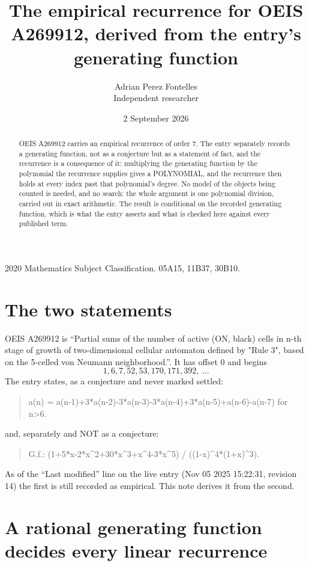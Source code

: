 \documentclass[11pt,a4paper]{article}
\title{The empirical recurrence for OEIS A269912, derived from the entry's generating function}
\author{Adrian Perez Fontelles\\ \small Independent researcher}
\date{2 September 2026}
\theoremstyle{plain}
\theoremstyle{definition}
\begin{document}
\maketitle

\begin{abstract}
OEIS A269912 carries an empirical recurrence of order $7$. The entry separately records a
generating function, not as a conjecture but as a statement of fact, and the recurrence is a
consequence of it: multiplying the generating function by the polynomial the recurrence
supplies gives a POLYNOMIAL, and the recurrence then holds at every index past that
polynomial's degree. No model of the objects being counted is needed, and no search: the
whole argument is one polynomial division, carried out in exact arithmetic. The result is
conditional on the recorded generating function, which is what the entry asserts and what is
checked here against every published term.
\end{abstract}

\noindent\small 2020 Mathematics Subject Classification. 05A15, 11B37, 30B10.\normalsize

\section{The two statements}

OEIS A269912 is ``Partial sums of the number of active (ON, black) cells in n-th stage of growth of two-dimensional cellular automaton defined by "Rule 3", based on the 5-celled von Neumann neighborhood.''. It has offset $0$ and begins
\[
1, 6, 7, 52, 53, 170, 171, 392,\ \dots
\]
The entry states, as a conjecture and never marked settled:
\begin{quote}
a(n) = a(n-1)+3*a(n-2)-3*a(n-3)-3*a(n-4)+3*a(n-5)+a(n-6)-a(n-7) for n>6.
\end{quote}
and, separately and NOT as a conjecture:
\begin{quote}
G.f.: (1+5*x-2*x\^{}2+30*x\^{}3+x\^{}4-3*x\^{}5) / ((1-x)\^{}4*(1+x)\^{}3).
\end{quote}
As of the ``Last modified'' line on the live entry (Nov 05 2025 15:22:31, revision 14) the first is still
recorded as empirical. This note derives it from the second.

\section{A rational generating function decides every linear recurrence}
\end{document}
